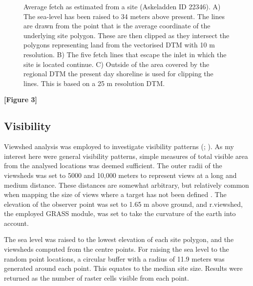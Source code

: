 \documentclass[12pt, a4paper]{article}
\begin{document}
\begin{figure}[!htb]
	\caption{Average fetch as estimated from a site (Askeladden ID 22346). A) The sea-level has been raised to 34 meters above present. The lines are drawn from the point that is the average coordinate of the underlying site polygon. These are then clipped as they intersect the polygons representing land from the vectorised DTM with 10 m resolution. B) The five fetch lines that escape the inlet in which the site is located continue. C) Outside of the area covered by the regional DTM the present day shoreline is used for clipping the lines. This is based on a 25 m resolution DTM.}\label{fig:fetch}
\end{figure}

\smallskip
\textbf{[Figure 3]}
\smallskip

\subsection{Visibility}
Viewshed analysis was employed to investigate visibility patterns (\citealp[][225--233]{conolly2006}; \citealp{gillings2020}). As my interest here were general visibility patterns, simple measures of total visible area from the analysed locations was deemed sufficient. The outer radii of the viewsheds was set to 5000 and 10,000 meters to represent views at a long and medium distance. These distances are somewhat arbitrary, but relatively common when mapping the size of views where a target has not been defined \citep[e.g.][]{lake2000, lopez2008, garcia2013}. The elevation of the observer point was set to 1.65 m above ground, and r.viewshed, the employed GRASS module, was set to take the curvature of the earth into account. \par
The sea level was raised to the lowest elevation of each site polygon, and the viewsheds computed from the centre points. For raising the sea level to the random point locations, a circular buffer with a radius of 11.9 meters was generated around each point. This equates to the median site size. Results were returned as the number of raster cells visible from each point. \par
\end{document}
